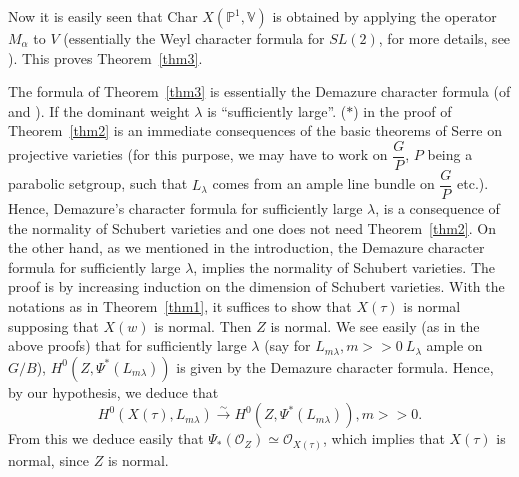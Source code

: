 \begin{Proof}
Now it is easily seen that Char $X\left(\mathbb{P}^{1}, \mathbb{V}\right)$ is obtained by applying the operator $M_{\alpha}$ to $V$ (essentially the Weyl character formula for $SL(2)$, for more details, see \cite{key6}). This proves Theorem~\ref{thm3}. 
\end{Proof}

\begin{rem}\label{rem2}
The formula of Theorem~\ref{thm3} is essentially the Demazure character formula (of \cite{key1} and \cite{key5}). If the dominant weight $\lambda$ is ``sufficiently large''. ($\ast$) in the proof of Theorem~\ref{thm2} is an immediate consequences of the basic theorems of Serre on projective varieties (for this purpose, we may have to work on $\dfrac{G}{P}$, $P$ being a parabolic setgroup, such that $L_{\lambda}$ comes from an ample line bundle on $\dfrac{G}{P}$ etc.). Hence, Demazure's character formula for sufficiently large $\lambda$, is a consequence of the normality of Schubert varieties and one does not need Theorem~\ref{thm2}. On the other hand, as we mentioned in the introduction, the Demazure character formula for sufficiently large $\lambda$, implies the  normality of Schubert varieties. The proof is by increasing induction on the dimension of Schubert varieties. With the notations as in Theorem~\ref{thm1}, it suffices to show that $X(\tau)$ is normal supposing that $X(w)$ is normal. Then $Z$ is normal. We see easily (as in the above proofs) that for sufficiently large $\lambda$ (say for $L_{m \lambda}, m> >0 \ L_{\lambda}$ ample on $G/B$), $H^{0}\left(Z, \Psi^{\ast} (L_{m \lambda})\right)$ is given by the Demazure character formula. Hence, by our hypothesis, we deduce that
$$
H^{0}(X(\tau), L_{m \lambda})\xrightarrow{\sim} H^{0}(Z, \Psi^{\ast}(L_{m\lambda})), m>>0. 
$$
\pageoriginale
From this we deduce easily that $\Psi_{\ast}(\mathscr{O}_Z)\simeq \mathscr{O}_{X(\tau)}$, which implies that $X(\tau)$ is normal, since $Z$ is normal.
\end{rem}

